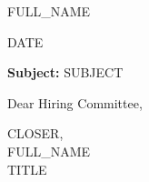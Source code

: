 \documentclass[12pt]{article}
\begin{document}
\AddToShipoutPictureBG{%
\color{headergray}
\AtPageUpperLeft{\rule[-0.92in]{\paperwidth}{0.92in}}
}

\begin{center}
{\fontsize{29}{32}\selectfont\scshape {{FULL_NAME}}}

\vspace{0.07in}
\small
\href{mailto:{{EMAIL}}}{\faEnvelope{}}\hfill
\href{https://linkedin.com/in/{{LINKEDIN}}}{\faLinkedinIn{}}\hfill
\href{tel:{{PHONE}}}{\faPhone{}}\hfill
\faMapMarker{}
\end{center}

\vspace{0.18in}

\begin{flushleft}
{{DATE}}

\vspace{0.05in}

\textbf{Subject:} {{SUBJECT}}

\vspace{0.11in}

Dear Hiring Committee,
\end{flushleft}

\vspace{0.08in}


\vspace{0.18in}

\begin{flushright}
{{CLOSER}},\\[1.4em]
{{FULL_NAME}}\\
{{TITLE}}
\end{flushright}
\end{document}
